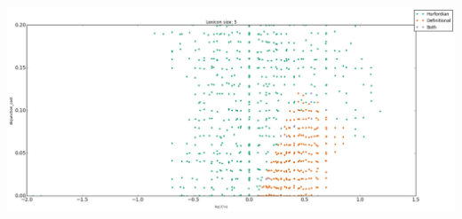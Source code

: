 \documentclass{article}
\begin{document}
\begin{examples}
  \includegraphics[width=1.2\textwidth]{fig/lex5-alpha-beta-gamma}

\end{examples}




\end{document}
